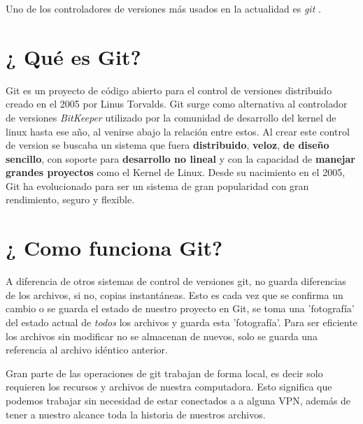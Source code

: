 \documentclass[12pt,a4paper]{article}
\begin{document}
Uno de los controladores de versiones más usados en la actualidad es \textit{git 	}.
\section*{¿ Qué es Git?}
Git es un proyecto de código abierto para el control de versiones distribuido creado en el 2005 por Linus Torvalds. Git surge como alternativa al controlador de versiones \textit{BitKeeper} utilizado por la comunidad de desarrollo del kernel de linux hasta ese año, al venirse abajo la relación entre estos. Al crear este control de version se buscaba un sistema que fuera \textbf{distribuido}, \textbf{veloz}, \textbf{de diseño sencillo}, con soporte para \textbf{desarrollo no lineal} y con la capacidad de \textbf{manejar grandes proyectos} como el Kernel de Linux. Desde su nacimiento en el 2005, Git ha evolucionado para ser un sistema de gran popularidad con gran rendimiento, seguro y flexible.

\section*{¿ Como funciona Git?}
A diferencia de otros sistemas de control de versiones git, no guarda diferencias de los archivos, si no, copias instantáneas. Esto es cada vez que se confirma un cambio o se guarda el estado de nuestro proyecto en Git, se toma una 'fotografía' del estado actual de \textit{todos} los archivos y guarda esta 'fotografía'. Para ser eficiente los archivos sin modificar no se almacenan de nuevos, solo se guarda una referencia al archivo idéntico  anterior.

Gran parte de las operaciones de git trabajan de forma local, es decir solo requieren los recursos y archivos de nuestra computadora. Esto significa que podemos trabajar sin necesidad de estar conectados a  a alguna VPN, además de tener a nuestro alcance toda la historia de nuestros archivos.
\end{document}
